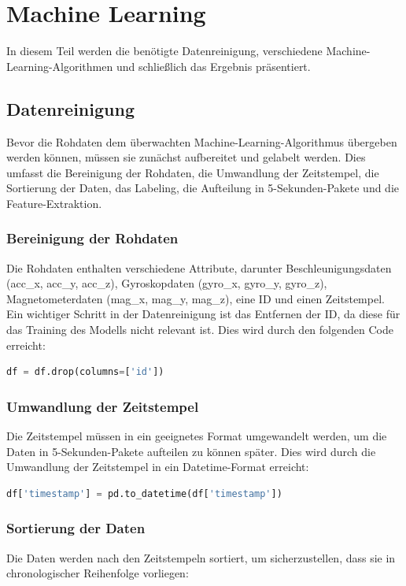 \chapter{Machine Learning}
In diesem Teil werden die benötigte Datenreinigung, verschiedene Machine-Learning-Algorithmen und schließlich das Ergebnis präsentiert.

\section{Datenreinigung}
Bevor die Rohdaten dem überwachten Machine-Learning-Algorithmus übergeben werden können, müssen sie zunächst aufbereitet und gelabelt werden. Dies umfasst die Bereinigung der Rohdaten, die Umwandlung der Zeitstempel, die Sortierung der Daten, das Labeling, die Aufteilung in 5-Sekunden-Pakete und die Feature-Extraktion. 

\subsection{Bereinigung der Rohdaten}
Die Rohdaten enthalten verschiedene Attribute, darunter Beschleunigungsdaten (acc\_x, acc\_y, acc\_z), Gyroskopdaten (gyro\_x, gyro\_y, gyro\_z), Magnetometerdaten (mag\_x, mag\_y, mag\_z), eine \ac{ID} und einen Zeitstempel. Ein wichtiger Schritt in der Datenreinigung ist das Entfernen der ID, da diese für das Training des Modells nicht relevant ist. Dies wird durch den folgenden Code erreicht:

\begin{lstlisting}[language=Python]
	df = df.drop(columns=['id'])
\end{lstlisting}

\subsection{Umwandlung der Zeitstempel}
Die Zeitstempel müssen in ein geeignetes Format umgewandelt werden, um die Daten in 5-Sekunden-Pakete aufteilen zu können später. Dies wird durch die Umwandlung der Zeitstempel in ein Datetime-Format erreicht:

\begin{lstlisting}[language=Python]
	df['timestamp'] = pd.to_datetime(df['timestamp'])
\end{lstlisting}

\subsection{Sortierung der Daten}
Die Daten werden nach den Zeitstempeln sortiert, um sicherzustellen, dass sie in chronologischer Reihenfolge vorliegen:

